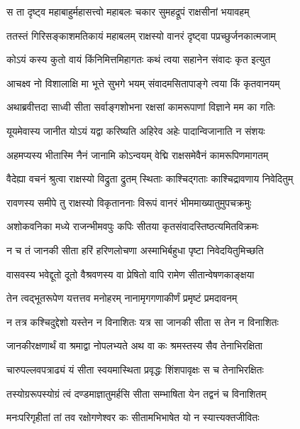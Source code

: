 \twolineshloka
{स ता दृष्ट्व महाबाहुर्महासत्त्वो महाबलः}
{चकार सुमहद्रूपं राक्षसीनां भयावहम्} %

\twolineshloka
{ततस्तं गिरिसङ्काशमतिकायं महाबलम्}
{राक्षस्यो वानरं दृष्ट्वा पप्रच्छुर्जनकात्मजाम्} %

\twolineshloka
{कोऽयं कस्य कुतो वायं किंनिमित्तमिहागतः}
{कथं त्वया सहानेन संवादः कृत इत्युत} %

\twolineshloka
{आचक्ष्व नो विशालाक्षि मा भूत्ते सुभगे भयम्}
{संवादमसितापाङ्गे त्वया किं कृतवानयम्} %

\twolineshloka
{अथाब्रवीत्तदा साध्वी सीता सर्वाङ्गशोभना}
{रक्षसां कामरूपाणां विज्ञाने मम का गतिः} %

\twolineshloka
{यूयमेवास्य जानीत योऽयं यद्वा करिष्यति}
{अहिरेव अहेः पादान्विजानाति न संशयः} %

\twolineshloka
{अहमप्यस्य भीतास्मि नैनं जानामि कोऽन्वयम्}
{वेद्मि राक्षसमेवैनं कामरूपिणमागतम्} %

\twolineshloka
{वैदेह्या वचनं श्रुत्वा राक्षस्यो विद्रुता द्रुतम्}
{स्थिताः काश्चिद्गताः काश्चिद्रावणाय निवेदितुम्} %

\twolineshloka
{रावणस्य समीपे तु राक्षस्यो विकृताननाः}
{विरूपं वानरं भीममाख्यातुमुपचक्रमुः} %

\twolineshloka
{अशोकवनिका मध्ये राजन्भीमवपुः कपिः}
{सीतया कृतसंवादस्तिष्ठत्यमितविक्रमः} %

\twolineshloka
{न च तं जानकी सीता हरिं हरिणलोचणा}
{अस्माभिर्बहुधा पृष्टा निवेदयितुमिच्छति} %

\twolineshloka
{वासवस्य भवेद्दूतो दूतो वैश्रवणस्य वा}
{प्रेषितो वापि रामेण सीतान्वेषणकाङ्क्षया} %

\twolineshloka
{तेन त्वद्भूतरूपेण यत्तत्तव मनोहरम्}
{नानामृगगणाकीर्णं प्रमृष्टं प्रमदावनम्} %

\twolineshloka
{न तत्र कश्चिदुद्देशो यस्तेन न विनाशितः}
{यत्र सा जानकी सीता स तेन न विनाशितः} %

\twolineshloka
{जानकीरक्षणार्थं वा श्रमाद्वा नोपलभ्यते}
{अथ वा कः श्रमस्तस्य सैव तेनाभिरक्षिता} %

\twolineshloka
{चारुपल्लवपत्राढ्यं यं सीता स्वयमास्थिता}
{प्रवृद्धः शिंशपावृक्षः स च तेनाभिरक्षितः} %

\twolineshloka
{तस्योग्ररूपस्योग्रं त्वं दण्डमाज्ञातुमर्हसि}
{सीता सम्भाषिता येन तद्वनं च विनाशितम्} %

\twolineshloka
{मनःपरिगृहीतां तां तव रक्षोगणेश्वर}
{कः सीतामभिभाषेत यो न स्यात्त्यक्तजीवितः} %


